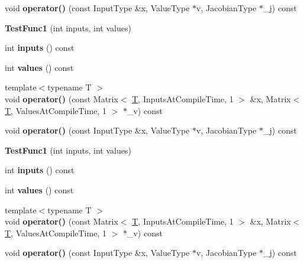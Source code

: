 \begin{DoxyCompactItemize}
\item 
\mbox{\label{struct_test_func1_ae4af3d01d2e53bdeb6fb908b945157a4}} 
void {\bfseries operator()} (const Input\+Type \&x, Value\+Type $\ast$v, Jacobian\+Type $\ast$\+\_\+j) const
\item 
\mbox{\label{struct_test_func1_af2a06629de53467c0d5c594018ee80a9}} 
{\bfseries Test\+Func1} (int inputs, int values)
\item 
\mbox{\label{struct_test_func1_a08733a3cf64b83c0d214ade243279e69}} 
int {\bfseries inputs} () const
\item 
\mbox{\label{struct_test_func1_a881325f1562912d74dcf228d0449fe8d}} 
int {\bfseries values} () const
\item 
\mbox{\label{struct_test_func1_a6d188c9a6b072162ef0130c850fa4778}} 
{\footnotesize template$<$typename T $>$ }\\void {\bfseries operator()} (const Matrix$<$ \hyperlink{group___sparse_core___module}{T}, Inputs\+At\+Compile\+Time, 1 $>$ \&x, Matrix$<$ \hyperlink{group___sparse_core___module}{T}, Values\+At\+Compile\+Time, 1 $>$ $\ast$\+\_\+v) const
\item 
\mbox{\label{struct_test_func1_ae4af3d01d2e53bdeb6fb908b945157a4}} 
void {\bfseries operator()} (const Input\+Type \&x, Value\+Type $\ast$v, Jacobian\+Type $\ast$\+\_\+j) const
\item 
\mbox{\label{struct_test_func1_af2a06629de53467c0d5c594018ee80a9}} 
{\bfseries Test\+Func1} (int inputs, int values)
\item 
\mbox{\label{struct_test_func1_a08733a3cf64b83c0d214ade243279e69}} 
int {\bfseries inputs} () const
\item 
\mbox{\label{struct_test_func1_a881325f1562912d74dcf228d0449fe8d}} 
int {\bfseries values} () const
\item 
\mbox{\label{struct_test_func1_a6d188c9a6b072162ef0130c850fa4778}} 
{\footnotesize template$<$typename T $>$ }\\void {\bfseries operator()} (const Matrix$<$ \hyperlink{group___sparse_core___module}{T}, Inputs\+At\+Compile\+Time, 1 $>$ \&x, Matrix$<$ \hyperlink{group___sparse_core___module}{T}, Values\+At\+Compile\+Time, 1 $>$ $\ast$\+\_\+v) const
\item 
\mbox{\label{struct_test_func1_ae4af3d01d2e53bdeb6fb908b945157a4}} 
void {\bfseries operator()} (const Input\+Type \&x, Value\+Type $\ast$v, Jacobian\+Type $\ast$\+\_\+j) const
\end{DoxyCompactItemize}

